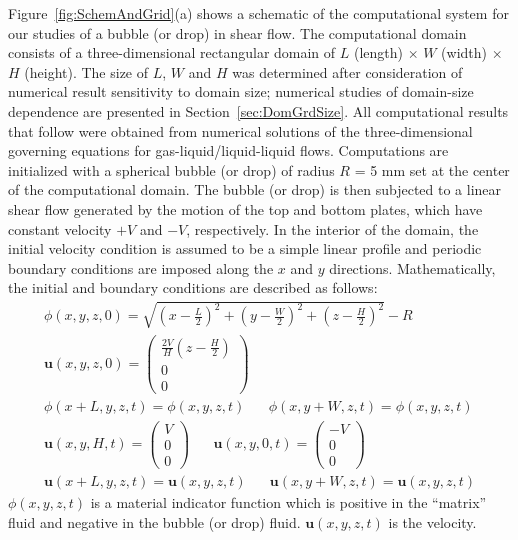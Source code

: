 \documentclass[%
 reprint,
 showkeys,
 amsmath,amssymb,
 aps,
 prfluids,
 onecolumn
]{revtex4-2}
\newcommand{\vv}{\mathbf}
\newcommand{\bmu}{\vv{u}}
\begin{document}
Figure~\ref{fig:SchemAndGrid}(a) shows a schematic of the computational system
for our studies of a bubble (or drop) in shear flow.  The computational domain
consists of a three-dimensional rectangular domain of $L$ (length) $\times$
$W$ (width) $\times$ $H$ (height).  The size of $L$, $W$ and $H$
was determined after consideration of numerical result sensitivity to domain
size; numerical studies of domain-size dependence are presented in
Section~\ref{sec:DomGrdSize}.  All computational results that follow were
obtained from numerical solutions of the three-dimensional governing equations
for gas-liquid/liquid-liquid flows.  Computations are initialized with a
spherical bubble {\color{red} (or drop) of radius $R$ = 5 mm set at the 
center of the computational domain.   The bubble (or drop) is then 
subjected to a
linear shear flow generated by the motion of the top and bottom plates, which 
have constant velocity $+V$ and $-V$, respectively.}  In the interior of the
domain, the initial velocity condition is assumed to be a simple linear profile
and periodic boundary conditions are imposed along the $x$ and $y$ directions.
Mathematically, the initial and boundary conditions are described as
follows:
\begin{eqnarray}
	\phi(x,y,z,0)=\sqrt{(x-\frac{L}{2})^{2}+(y-\frac{W}{2})^{2}+
	(z-\frac{H}{2})^{2}}-R \label{IC_BC} \\
	\bmu(x,y,z,0)=\left( \begin{array}{c}
		\frac{2V}{H}(z-\frac{H}{2}) \\ 0 \\ 0 
	\end{array} \right) \nonumber \\
	\phi(x+L,y,z,t)=\phi(x,y,z,t) \hspace{20pt}
	\phi(x,y+W,z,t)=\phi(x,y,z,t) \nonumber \\
	\bmu(x,y,H,t)=\left( \begin{array}{c}
		                V \\ 0 \\ 0 
	\end{array} \right)  \hspace{20pt}
	\bmu(x,y,0,t)=\left( \begin{array}{c}
		                -V \\ 0 \\ 0 
	\end{array} \right)  \nonumber \\
	\bmu(x+L,y,z,t)=\bmu(x,y,z,t) \hspace{20pt} 
	\bmu(x,y+W,z,t)=\bmu(x,y,z,t) \nonumber
\end{eqnarray}
$\phi(x,y,z,t)$ is a material indicator function which is positive 
in the ``matrix'' fluid and negative in the bubble (or drop) fluid.
$\bmu(x,y,z,t)$ is the velocity.
\end{document}
